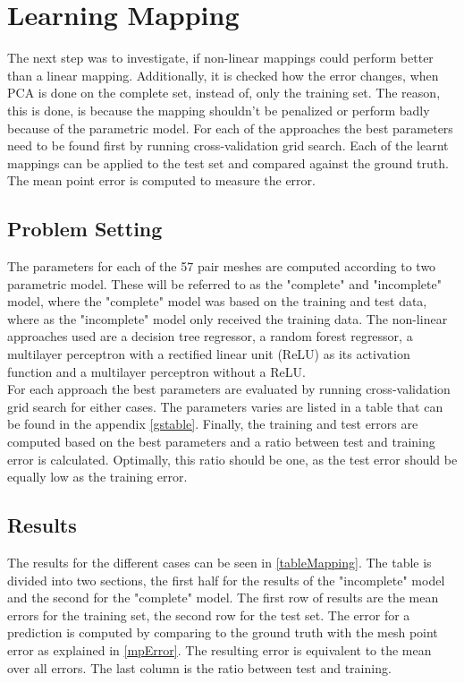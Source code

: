 \section{Learning Mapping}
The next step was to investigate, if non-linear mappings could perform better than a linear mapping. Additionally, it is checked how the error changes, when PCA is done on the complete set, instead of, only the training set. The reason, this is done, is because the mapping shouldn't be penalized or perform badly because of the parametric model. For each of the approaches the best parameters need to be found first by running cross-validation grid search. Each of the learnt mappings can be applied to the test set and compared against the ground truth. The mean point error is computed to measure the error.

\subsection{Problem Setting}
The parameters for each of the 57 pair meshes are computed according to two parametric model. These will be referred to as the "complete" and "incomplete" model, where the "complete" model was based on the training and test data, where as the "incomplete" model only received the training data. The non-linear approaches used are a decision tree regressor, a random forest regressor, a multilayer perceptron with a rectified linear unit (ReLU) as its activation function and a multilayer perceptron without a ReLU. \\
For each approach the best parameters are evaluated by running cross-validation grid search for either cases. The parameters varies are listed in a table that can be found in the appendix \ref{gstable}. %
Finally, the training and test errors are computed based on the best parameters and a ratio between test and training error is calculated. Optimally, this ratio should be one, as the test error should be equally low as the training error.

\subsection{Results}
The results for the different cases can be seen in \ref{tableMapping}. The table is divided into two sections, the first half for the results of the "incomplete" model and the second for the "complete" model. The first row of results are the mean errors for the training set, the second row for the test set. The error for a prediction is computed by comparing to the ground truth with the mesh point error as explained in \ref{mpError}. The resulting error is equivalent to the mean over all errors. The last column is the ratio between test and training.

